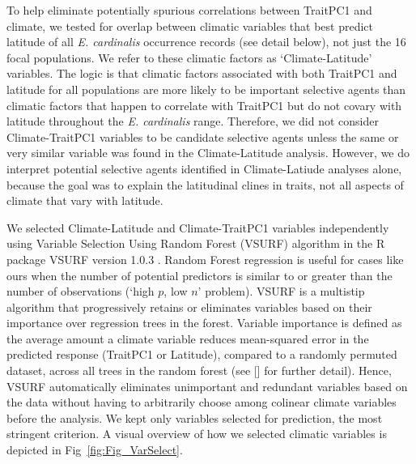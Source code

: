 \documentclass[11pt, oneside]{article}
\newcommand{\pkg}[1]{{\fontseries{b}\selectfont #1}}
\begin{document}
To help eliminate potentially spurious correlations between TraitPC1 and climate, we tested for overlap between climatic variables that best predict latitude of all \textit{E. cardinalis} occurrence records (see detail below), not just the 16 focal populations. We refer to these climatic factors as `Climate-Latitude' variables. The logic is that climatic factors associated with both TraitPC1 and latitude for all populations are more likely to be important selective agents than climatic factors that happen to correlate with TraitPC1 but do not covary with latitude throughout the \textit{E. cardinalis} range. Therefore, we did not consider Climate-TraitPC1 variables to be candidate selective agents unless the same or very similar variable was found in the Climate-Latitude analysis. However, we do interpret potential selective agents identified in Climate-Latiude analyses alone, because the goal was to explain the latitudinal clines in traits, not all aspects of climate that vary with latitude.

We selected Climate-Latitude and Climate-TraitPC1 variables independently using Variable Selection Using Random Forest (VSURF) algorithm in the R package \pkg{VSURF} version 1.0.3 \citep{Genuer_etal_2016}. Random Forest regression is useful for cases like ours when the number of potential predictors is similar to or greater than the number of observations (`high $p$, low $n$' problem). VSURF is a multistip algorithm that progressively retains or eliminates variables based on their importance over regression trees in the forest. Variable importance is defined as the average amount a climate variable reduces mean-squared error in the predicted response (TraitPC1 or Latitude), compared to a randomly permuted dataset, across all trees in the random forest (see \citeauthor{Genuer_etal_2015} [\citeyear{Genuer_etal_2015}] for further detail). Hence, VSURF automatically eliminates unimportant and redundant variables based on the data without having to arbitrarily choose among colinear climate variables before the analysis. We kept only variables selected for prediction, the most stringent criterion. A visual overview of how we selected climatic variables is depicted in Fig~\ref{fig:Fig_VarSelect}. 


\end{document}
